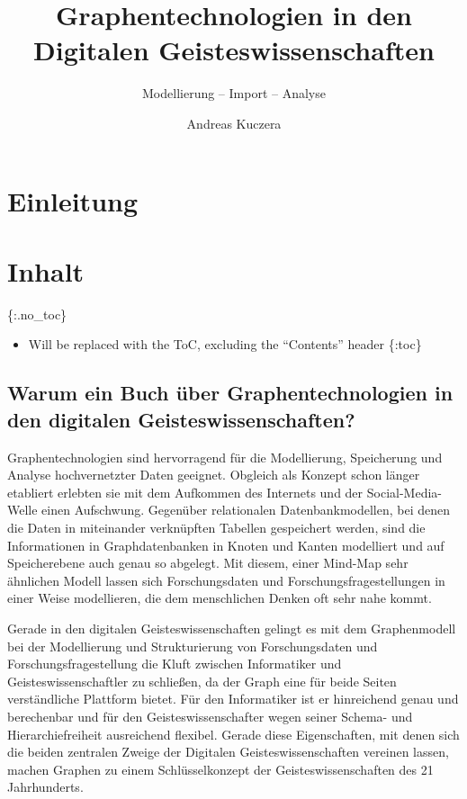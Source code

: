 \documentclass[ngerman,]{scrreprt}
\title{Graphentechnologien in den Digitalen Geisteswissenschaften}
\subtitle{Modellierung -- Import -- Analyse}
\author{Andreas Kuczera}
\date{}
\providecommand{\tightlist}{%
  \setlength{\itemsep}{0pt}\setlength{\parskip}{0pt}}
\begin{document}
\maketitle

{
\hypersetup{linkcolor=black}
\setcounter{tocdepth}{2}
\tableofcontents
}
\chapter{Einleitung}\label{einleitung}

\chapter{Inhalt}\label{inhalt}

\{:.no\_toc\}

\begin{itemize}
\tightlist
\item
  Will be replaced with the ToC, excluding the ``Contents'' header \{:toc\}
\end{itemize}

\section{Warum ein Buch über Graphentechnologien in den digitalen Geisteswissenschaften?}\label{warum-ein-buch-uxfcber-graphentechnologien-in-den-digitalen-geisteswissenschaften}

Graphentechnologien sind hervorragend für die Modellierung, Speicherung und Analyse hochvernetzter Daten geeignet. Obgleich als Konzept schon länger etabliert erlebten sie mit dem Aufkommen des Internets und der Social-Media-Welle einen Aufschwung. Gegenüber relationalen Datenbankmodellen, bei denen die Daten in miteinander verknüpften Tabellen gespeichert werden, sind die Informationen in Graphdatenbanken in Knoten und Kanten modelliert und auf Speicherebene auch genau so abgelegt. Mit diesem, einer Mind-Map sehr ähnlichen Modell lassen sich Forschungsdaten und Forschungsfragestellungen in einer Weise modellieren, die dem menschlichen Denken oft sehr nahe kommt.

Gerade in den digitalen Geisteswissenschaften gelingt es mit dem Graphenmodell bei der Modellierung und Strukturierung von Forschungsdaten und Forschungsfragestellung die Kluft zwischen Informatiker und Geisteswissenschaftler zu schließen, da der Graph eine für beide Seiten verständliche Plattform bietet. Für den Informatiker ist er hinreichend genau und berechenbar und für den Geisteswissenschafter wegen seiner Schema- und Hierarchiefreiheit ausreichend flexibel. Gerade diese Eigenschaften, mit denen sich die beiden zentralen Zweige der Digitalen Geisteswissenschaften vereinen lassen, machen Graphen zu einem Schlüsselkonzept der Geisteswissenschaften des 21 Jahrhunderts.
\end{document}
